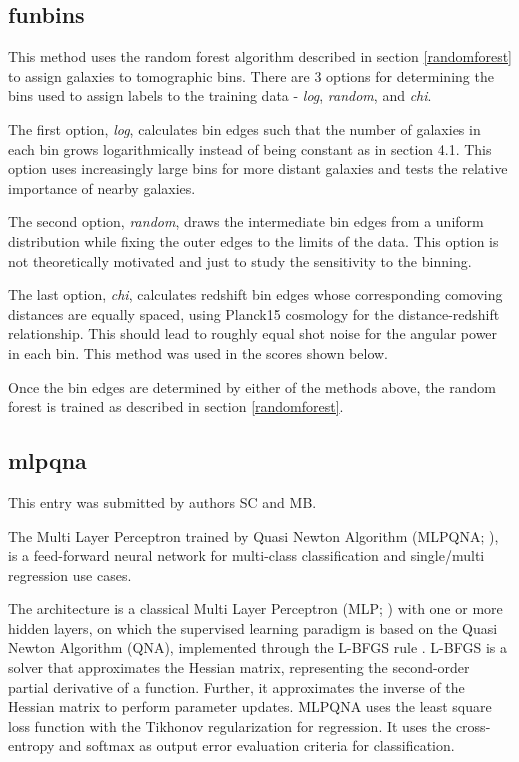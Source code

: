 \documentclass[twocolumn,twocolappendix]{aastex63}
\begin{document}
\subsection{ {\sc funbins} }
This method uses the random forest algorithm described in section \ref{randomforest} to assign galaxies to tomographic bins. There are 3 options for determining the bins used to assign labels to the training data - \textit{log}, \textit{random}, and \textit{chi}. 

The first option, \textit{log}, calculates bin edges such that the number of galaxies in each bin grows logarithmically instead of being constant as in section 4.1. This option uses increasingly large bins for more distant galaxies and tests the relative importance of nearby galaxies.

The second option, \textit{random}, draws the intermediate bin edges from a uniform distribution while fixing the outer edges to the limits of the data. This option is not theoretically motivated and just to study the sensitivity to the binning. 

The last option, \textit{chi}, calculates redshift bin edges whose corresponding comoving distances are equally spaced, using Planck15 \citep{Planck15} cosmology for the distance-redshift relationship. This should lead to roughly equal shot noise for the angular power in each bin. 
This method was used in the scores shown below.

Once the bin edges are determined by either of the methods above, the random forest is trained as described in section \ref{randomforest}.



\subsection{ {\sc mlpqna} }
This entry was submitted by authors SC and MB.

The Multi Layer Perceptron trained by Quasi Newton Algorithm 
({\sc MLPQNA}; \citealp{Brescia12}), is a feed-forward neural network 
for multi-class classification and single/multi regression use cases.

The architecture is a classical Multi Layer Perceptron (MLP; \citealp{Rosenblatt1961})
with one or more hidden layers, on which the supervised learning paradigm is
based on the Quasi Newton Algorithm (QNA), implemented through the L-BFGS rule
\citep{Nocedal80}. L-BFGS is a solver that approximates the Hessian matrix,
representing the second-order partial derivative of a function. Further, it
approximates the inverse of the Hessian matrix to perform parameter updates.
MLPQNA uses the least square loss function with the Tikhonov regularization
\citep{Tikhonov77} for regression. It uses the cross-entropy \citep{deBoer05}
and softmax \citep{Sutton98} as output error evaluation criteria for
classification.
\end{document}
